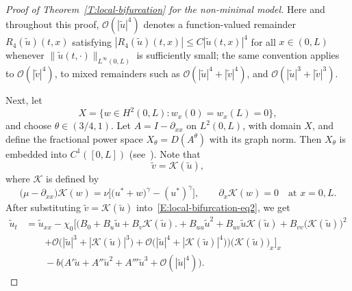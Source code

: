 \documentclass[11pt]{article} %
\theoremstyle{remark}
\theoremstyle{remark}
\numberwithin{equation}{section}
\numberwithin{figure}{section}
\numberwithin{table}{section}
\begin{document}
\begin{proof}[Proof of Theorem~\ref{T:local-bifurcation}  for the non-minimal model]
  Here and throughout this proof, $\mathcal{O}(|\tilde{u}|^4)$ denotes a
  function-valued remainder $R_4(\tilde{u})(t,x)$ satisfying
  $|R_4(\tilde{u})(t,x)| \le C |\tilde{u}(t,x)|^4$ for all $x \in (0, L)$
  whenever $\|{\tilde{u}(t,\cdot)}\|_{L^\infty(0,L)}$ is sufficiently small; the
  same convention applies to $\mathcal{O}(|\tilde{v}|^4)$, to mixed remainders
  such as $\mathcal{O}(|\tilde{u}|^4 + |\tilde{v}|^4)$, and
  $\mathcal{O}(|\tilde{u}|^3 + |\tilde{v}|^3)$.

  Next, let
  \[
    X=\Big\{w\in H^2(0,L):w_x(0)=w_x(L)=0\Big\},
  \]
  and choose $\theta \in (3/4, 1)$.  Let  $A = I - \partial_{xx}$ on $L^2(0,L)$,
  with domain $X$, and define the fractional power space $X_\theta =
  D(A^\theta)$ with its graph norm. Then $X_\theta$ is embedded into $C^1([0,
  L])$ (see~\cite[Theorem 1.6.1]{henry:81:geometric}). Note that
  \[
    \tilde{v}=\mathcal{K}(\tilde{u}),
  \]
  where $\mathcal{K}$ is defined by
  \begin{equation}\label{E:K-operator-eq}
    \Big(\mu-\partial_{xx}\Big)\mathcal{K}(w)
    =\nu\Big[\Big(u^*+w\Big)^\gamma-(u^*)^\gamma\Big],
    \qquad
    \partial_x\mathcal{K}(w)=0\quad\text{at }x=0,L.
  \end{equation}
  After substituting $\widetilde{v} = \mathcal{K}(\tilde{u})$
  into~\eqref{E:local-bifurcation-eq2}, we get
  \begin{align}\label{E:local-bifurcation-eq2-new}
    \tilde{u}_t
    & = \tilde{u}_{xx}
    - \chi_0\Big[\Big(  B_0+B_u\tilde{u}
    + B_v\mathcal{K}(\tilde{u})\Big. \nonumber
    + B_{uu}\tilde{u}^2
    + B_{uv}\tilde{u}\mathcal{K}(\tilde{u})
    + B_{vv}\big(\mathcal{K}(\tilde{u})\big)^2 \nonumber \\
    & \qquad {+ \mathcal{O}\big(|\tilde{u}|^3+|\mathcal{K}(\tilde{u})|^3\big) }
    +
    \mathcal{O}\big(|\tilde{u}|^4+|\mathcal{K}(\tilde{u})|^4\big)\Big)\Big(\mathcal{K}(\tilde{u})\Big)_x\Big]_x
    \nonumber \\
    & \qquad - b\Big( A'\tilde{u}
    + A'' \tilde{u}^2 + A'''\tilde{u}^3
    + \mathcal{O}(|\tilde{u}|^4)\Big).
  \end{align}



\end{proof}
\end{document}
